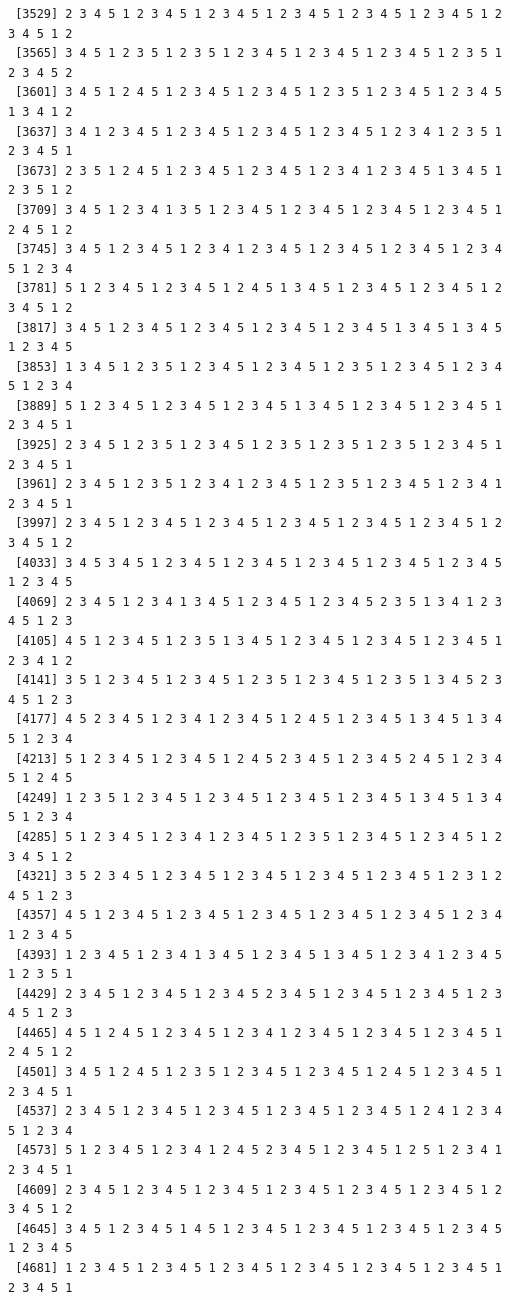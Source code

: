 \documentclass[
  english,
]{book}
\begin{document}
\begin{verbatim}
 [3529] 2 3 4 5 1 2 3 4 5 1 2 3 4 5 1 2 3 4 5 1 2 3 4 5 1 2 3 4 5 1 2 3 4 5 1 2
 [3565] 3 4 5 1 2 3 5 1 2 3 5 1 2 3 4 5 1 2 3 4 5 1 2 3 4 5 1 2 3 5 1 2 3 4 5 2
 [3601] 3 4 5 1 2 4 5 1 2 3 4 5 1 2 3 4 5 1 2 3 5 1 2 3 4 5 1 2 3 4 5 1 3 4 1 2
 [3637] 3 4 1 2 3 4 5 1 2 3 4 5 1 2 3 4 5 1 2 3 4 5 1 2 3 4 1 2 3 5 1 2 3 4 5 1
 [3673] 2 3 5 1 2 4 5 1 2 3 4 5 1 2 3 4 5 1 2 3 4 1 2 3 4 5 1 3 4 5 1 2 3 5 1 2
 [3709] 3 4 5 1 2 3 4 1 3 5 1 2 3 4 5 1 2 3 4 5 1 2 3 4 5 1 2 3 4 5 1 2 4 5 1 2
 [3745] 3 4 5 1 2 3 4 5 1 2 3 4 1 2 3 4 5 1 2 3 4 5 1 2 3 4 5 1 2 3 4 5 1 2 3 4
 [3781] 5 1 2 3 4 5 1 2 3 4 5 1 2 4 5 1 3 4 5 1 2 3 4 5 1 2 3 4 5 1 2 3 4 5 1 2
 [3817] 3 4 5 1 2 3 4 5 1 2 3 4 5 1 2 3 4 5 1 2 3 4 5 1 3 4 5 1 3 4 5 1 2 3 4 5
 [3853] 1 3 4 5 1 2 3 5 1 2 3 4 5 1 2 3 4 5 1 2 3 5 1 2 3 4 5 1 2 3 4 5 1 2 3 4
 [3889] 5 1 2 3 4 5 1 2 3 4 5 1 2 3 4 5 1 3 4 5 1 2 3 4 5 1 2 3 4 5 1 2 3 4 5 1
 [3925] 2 3 4 5 1 2 3 5 1 2 3 4 5 1 2 3 5 1 2 3 5 1 2 3 5 1 2 3 4 5 1 2 3 4 5 1
 [3961] 2 3 4 5 1 2 3 5 1 2 3 4 1 2 3 4 5 1 2 3 5 1 2 3 4 5 1 2 3 4 1 2 3 4 5 1
 [3997] 2 3 4 5 1 2 3 4 5 1 2 3 4 5 1 2 3 4 5 1 2 3 4 5 1 2 3 4 5 1 2 3 4 5 1 2
 [4033] 3 4 5 3 4 5 1 2 3 4 5 1 2 3 4 5 1 2 3 4 5 1 2 3 4 5 1 2 3 4 5 1 2 3 4 5
 [4069] 2 3 4 5 1 2 3 4 1 3 4 5 1 2 3 4 5 1 2 3 4 5 2 3 5 1 3 4 1 2 3 4 5 1 2 3
 [4105] 4 5 1 2 3 4 5 1 2 3 5 1 3 4 5 1 2 3 4 5 1 2 3 4 5 1 2 3 4 5 1 2 3 4 1 2
 [4141] 3 5 1 2 3 4 5 1 2 3 4 5 1 2 3 5 1 2 3 4 5 1 2 3 5 1 3 4 5 2 3 4 5 1 2 3
 [4177] 4 5 2 3 4 5 1 2 3 4 1 2 3 4 5 1 2 4 5 1 2 3 4 5 1 3 4 5 1 3 4 5 1 2 3 4
 [4213] 5 1 2 3 4 5 1 2 3 4 5 1 2 4 5 2 3 4 5 1 2 3 4 5 2 4 5 1 2 3 4 5 1 2 4 5
 [4249] 1 2 3 5 1 2 3 4 5 1 2 3 4 5 1 2 3 4 5 1 2 3 4 5 1 3 4 5 1 3 4 5 1 2 3 4
 [4285] 5 1 2 3 4 5 1 2 3 4 1 2 3 4 5 1 2 3 5 1 2 3 4 5 1 2 3 4 5 1 2 3 4 5 1 2
 [4321] 3 5 2 3 4 5 1 2 3 4 5 1 2 3 4 5 1 2 3 4 5 1 2 3 4 5 1 2 3 1 2 4 5 1 2 3
 [4357] 4 5 1 2 3 4 5 1 2 3 4 5 1 2 3 4 5 1 2 3 4 5 1 2 3 4 5 1 2 3 4 1 2 3 4 5
 [4393] 1 2 3 4 5 1 2 3 4 1 3 4 5 1 2 3 4 5 1 3 4 5 1 2 3 4 1 2 3 4 5 1 2 3 5 1
 [4429] 2 3 4 5 1 2 3 4 5 1 2 3 4 5 2 3 4 5 1 2 3 4 5 1 2 3 4 5 1 2 3 4 5 1 2 3
 [4465] 4 5 1 2 4 5 1 2 3 4 5 1 2 3 4 1 2 3 4 5 1 2 3 4 5 1 2 3 4 5 1 2 4 5 1 2
 [4501] 3 4 5 1 2 4 5 1 2 3 5 1 2 3 4 5 1 2 3 4 5 1 2 4 5 1 2 3 4 5 1 2 3 4 5 1
 [4537] 2 3 4 5 1 2 3 4 5 1 2 3 4 5 1 2 3 4 5 1 2 3 4 5 1 2 4 1 2 3 4 5 1 2 3 4
 [4573] 5 1 2 3 4 5 1 2 3 4 1 2 4 5 2 3 4 5 1 2 3 4 5 1 2 5 1 2 3 4 1 2 3 4 5 1
 [4609] 2 3 4 5 1 2 3 4 5 1 2 3 4 5 1 2 3 4 5 1 2 3 4 5 1 2 3 4 5 1 2 3 4 5 1 2
 [4645] 3 4 5 1 2 3 4 5 1 4 5 1 2 3 4 5 1 2 3 4 5 1 2 3 4 5 1 2 3 4 5 1 2 3 4 5
 [4681] 1 2 3 4 5 1 2 3 4 5 1 2 3 4 5 1 2 3 4 5 1 2 3 4 5 1 2 3 4 5 1 2 3 4 5 1

\end{verbatim}
\end{document}
